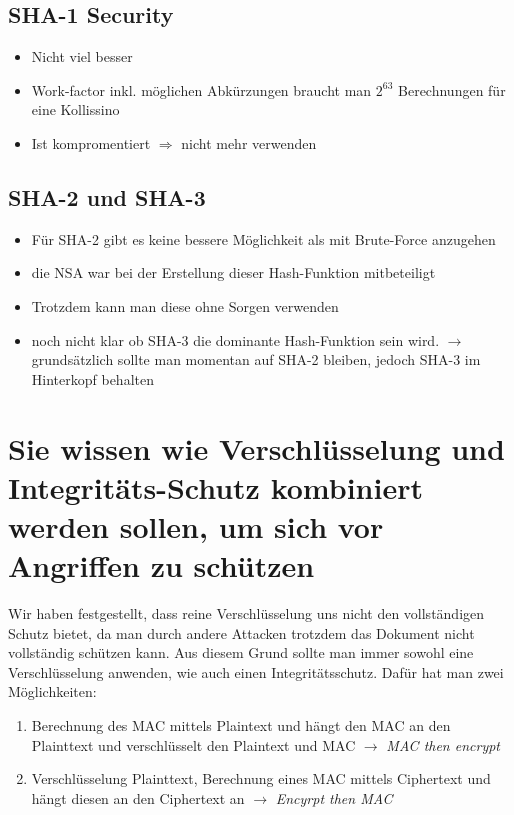 \documentclass{report}
\theoremstyle{definition}
\theoremstyle{example}
\begin{document}
	\subsection{SHA-1 Security}
\begin{itemize}
	\item Nicht viel besser
	\item Work-factor inkl. möglichen Abkürzungen braucht man $2^{63}$ Berechnungen für eine Kollissino
	\item Ist kompromentiert $\Rightarrow$ nicht mehr verwenden
\end{itemize}

	\subsection{SHA-2 und SHA-3}
\begin{itemize}
	\item Für SHA-2 gibt es keine bessere Möglichkeit als mit Brute-Force anzugehen
	\item die NSA war bei der Erstellung dieser Hash-Funktion mitbeteiligt
	\item Trotzdem kann man diese ohne Sorgen verwenden
	\item noch nicht klar ob SHA-3 die dominante Hash-Funktion sein wird. $\rightarrow$ grundsätzlich sollte man momentan auf SHA-2 bleiben, jedoch SHA-3 im Hinterkopf behalten
\end{itemize}

\section{Sie wissen wie Verschlüsselung und Integritäts-Schutz kombiniert werden sollen, um sich vor Angriffen zu schützen}
Wir haben festgestellt, dass reine Verschlüsselung uns nicht den vollständigen Schutz bietet, da man durch andere Attacken trotzdem das Dokument nicht vollständig schützen kann. Aus diesem Grund sollte man immer sowohl eine Verschlüsselung anwenden, wie auch einen Integritätsschutz. Dafür hat man zwei Möglichkeiten:
\begin{enumerate}
	\item Berechnung des MAC mittels Plaintext und hängt den MAC an den Plainttext und verschlüsselt den Plaintext und MAC $\rightarrow$ \textit{MAC then encrypt}
	\item Verschlüsselung Plainttext, Berechnung eines MAC mittels Ciphertext und hängt diesen an den Ciphertext an $\rightarrow$ \textit{Encyrpt then MAC}
\end{enumerate}
\end{document}

